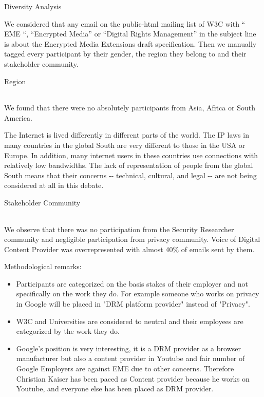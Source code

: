 \protect\hypertarget{anchor-16}{}{}Diversity Analysis

We considered that any email on the public-html mailing list of W3C with
`` EME ``, ``Encrypted Media'' or ``Digital Rights Management'' in the
subject line is about the Encrypted Media Extensions draft
specification. Then we manually tagged every participant by their
gender, the region they belong to and their stakeholder community.

\protect\hypertarget{anchor-17}{}{}Region

\begin{longtable}[]{@{}@{}}
\toprule
\tabularnewline
\tabularnewline
\tabularnewline
\tabularnewline
\tabularnewline
\tabularnewline
\tabularnewline
\tabularnewline
\bottomrule
\end{longtable}

We found that there were no absolutely participants from Asia, Africa or
South America.

The Internet is lived differently in different parts of the world. The
IP laws in many countries in the global South are very different to
those in the USA or Europe. In addition, many internet users in these
countries use connections with relatively low bandwidths. The lack of
representation of people from the global South means that their concerns
-\/- technical, cultural, and legal -\/- are not being considered at all
in this debate.

\protect\hypertarget{anchor-18}{}{}

\protect\hypertarget{anchor-19}{}{}Stakeholder Community

\begin{longtable}[]{@{}@{}}
\toprule
\tabularnewline
\tabularnewline
\tabularnewline
\tabularnewline
\tabularnewline
\tabularnewline
\tabularnewline
\tabularnewline
\tabularnewline
\tabularnewline
\bottomrule
\end{longtable}

We observe that there was no participation from the Security Researcher
community and negligible participation from privacy community. Voice of
Digital Content Provider was overrepresented with almost 40\% of emails
sent by them.

Methodological remarks:

\begin{itemize}
\tightlist
\item
  Participants are categorized on the basis stakes of their employer and
  not specifically on the work they do. For example someone who works on
  privacy in Google will be placed in "DRM platform provider" instead of
  "Privacy".
\item
  W3C and Universities are considered to neutral and their employees are
  categorized by the work they do.
\item
  Google's position is very interesting, it is a DRM provider as a
  browser manufacturer but also a content provider in Youtube and fair
  number of Google Employers are against EME due to other concerns.
  Therefore Christian Kaiser has been paced as Content provider because
  he works on Youtube, and everyone else has been placed as DRM
  provider.
\end{itemize}

